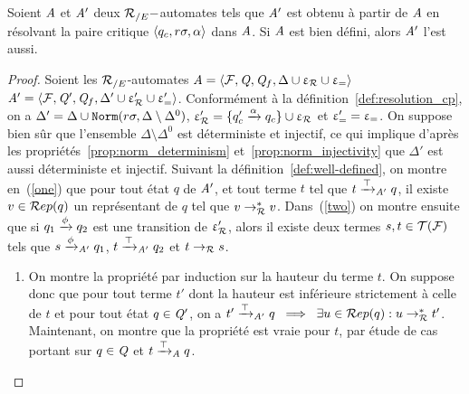 \begin{lemma}
  \label{lemma:C-well-defined}
  Soient $\mathit A$ et $\mathit A'$ deux ${\mathcal R_{/E}}-$automates tels que 
  $\mathit A'$ est obtenu à partir de $\mathit A$ en résolvant 
  la paire critique $\langle q_c, r\sigma,\alpha \rangle$ dans $\mathit A$. 
  Si $\mathit A$ est bien défini, alors $\mathit A'$ l'est aussi. 
\end{lemma}
\begin{proof}
  Soient les ${\mathcal R_{/E}}$-automates $\mathit A=\langle \mathcal{F}, \mathit Q, \mathit Q_f, \Delta\cup \upvarepsilon_{\mathcal R}\cup \upvarepsilon_{=}\rangle$ 
  $\mathit A'=\langle \mathcal{F}, \mathit Q', \mathit Q_f, \Delta'\cup \upvarepsilon_{\mathcal R}'\cup \upvarepsilon_{=}' \rangle$.  Conformément 
  à la définition~\ref{def:resolution_cp}, on a $\Delta'=\Delta \cup
  \mathtt{Norm}(r\sigma, \Delta\setminus \Delta^0)$, $\upvarepsilon_{\mathcal R}'= \{
  q'_c\xrightarrow{\alpha} q_c\}\cup \upvarepsilon_{\mathcal R}$ et $\upvarepsilon_{=}'=\upvarepsilon_{=}$. On suppose bien sûr que l'ensemble $\Delta\setminus\Delta^0$
  est déterministe et injectif, ce qui implique d'après les propriétés~\ref{prop:norm_determinism} et~\ref{prop:norm_injectivity}
  que $\Delta'$ est aussi déterministe et injectif. Suivant la définition~\ref{def:well-defined}, on montre en~(\ref{one}) que 
  pour tout état $q$ de $\mathit A'$, et tout terme $t$ tel que $t \xrightarrow{\top}_{\mathit A'} q$, il existe $v \in \mathcal R ep(q)$ un représentant de $q$ 
  tel que $v \rightarrow^*_\mathcal R v$. Dans~(\ref{two}) on montre ensuite que si $q_1 \xrightarrow{\phi} q_2$ est une transition de $\upvarepsilon_{\mathcal R}'$, alors il 
  existe deux termes $s,t\in \mathcal{T(F)}$ tels que $s\xrightarrow{\phi}_{\mathit A'} q_1$, $t\xrightarrow{\top}_{\mathit A'} q_2$ et $t \rightarrow_\mathcal R s$.
\medskip
  
\begin{enumerate}
\item \label{one} 



  \newcommand{\xrwa}{\xrw{\top}_\A}
  \newcommand{\xrwap}{\xrw{\top}_{\A'}}

  On montre la propriété par induction sur la hauteur du terme $t$. 
  On suppose donc que pour tout terme $t'$ dont la hauteur est inférieure strictement à celle de $t$
  et pour tout état $q\in \mathit Q'$, on a $t' \xrwap q \spf \exists u\in \Rep(q): u \rwR^* t'$.
  Maintenant, on montre que la propriété est vraie pour $t$, par étude de cas portant sur $q\in\mathit Q$ et $t\xrwa q$.


\end{enumerate}
\end{proof}
